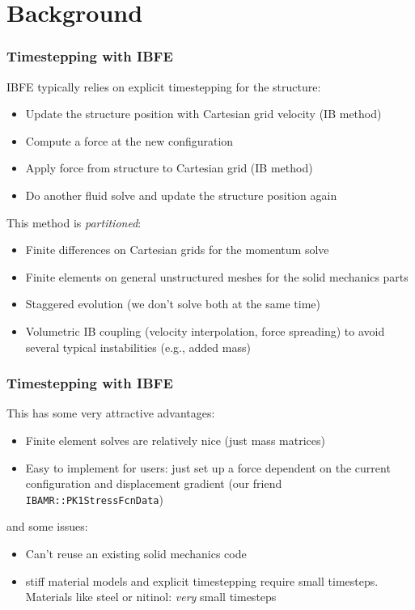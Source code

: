\documentclass[8pt]{beamer}
\begin{document}
\section{Background}
\begin{frame}
    \frametitle{Timestepping with IBFE}
    IBFE typically relies on explicit timestepping for the structure:
    \begin{itemize}
      \item Update the structure position with Cartesian grid velocity (IB method)
      \item Compute a force at the new configuration
      \item Apply force from structure to Cartesian grid (IB method)
      \item Do another fluid solve and update the structure position again
    \end{itemize}
    This method is \emph{partitioned}:
    \begin{itemize}
      \item Finite differences on Cartesian grids for the momentum solve
      \item Finite elements on general unstructured meshes for the solid mechanics parts
      \item Staggered evolution (we don't solve both at the same time)
      \item Volumetric IB coupling (velocity interpolation, force spreading) to
        avoid several typical instabilities (e.g., added mass)
    \end{itemize}
\end{frame}

\begin{frame}
    \frametitle{Timestepping with IBFE}
    This has some very attractive advantages:
    \begin{itemize}
      \item Finite element solves are relatively nice (just mass matrices)
      \item Easy to implement for users: just set up a force dependent on the
        current configuration and displacement gradient (our friend
        \texttt{IBAMR::PK1StressFcnData})
    \end{itemize}
    and some issues:
    \begin{itemize}
      \item Can't reuse an existing solid mechanics code
      \item stiff material models and explicit timestepping require small timesteps. Materials like steel or nitinol: \emph{very} small timesteps
    \end{itemize}
\end{frame}
\end{document}
